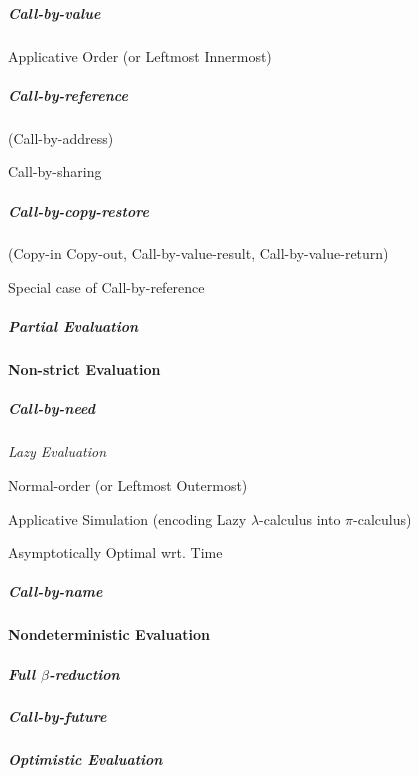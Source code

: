 \subparagraph{Call-by-value}\label{sec:call_by_value}\hfill

Applicative Order (or Leftmost Innermost)



\subparagraph{Call-by-reference}\label{sec:call_by_reference}\hfill

(Call-by-address)

Call-by-sharing



\subparagraph{Call-by-copy-restore}\label{sec:call_by_copy_restore}\hfill

(Copy-in Copy-out, Call-by-value-result, Call-by-value-return)

Special case of Call-by-reference



\subparagraph{Partial Evaluation}\label{sec:partial_evaluation}\hfill



\paragraph{Non-strict Evaluation}\label{sec:nonstrict_evaluation}\hfill

\subparagraph{Call-by-need}\label{sec:call_by_need}\hfill

\emph{Lazy Evaluation}

Normal-order (or Leftmost Outermost)

Applicative Simulation (encoding Lazy $\lambda$-calculus into
$\pi$-calculus) \cite{milner92}

Asymptotically Optimal wrt. Time %



\subparagraph{Call-by-name}\label{sec:call_by_name}\hfill



\paragraph{Nondeterministic Evaluation}\hfill
\label{sec:nondeterministic_evaluation}



\subparagraph{Full $\beta$-reduction}\label{sec:full_beta_reduction}\hfill

\subparagraph{Call-by-future}\label{sec:call_by_future}\hfill

\subparagraph{Optimistic Evaluation}\label{sec:optimistic_evaluation}\hfill



